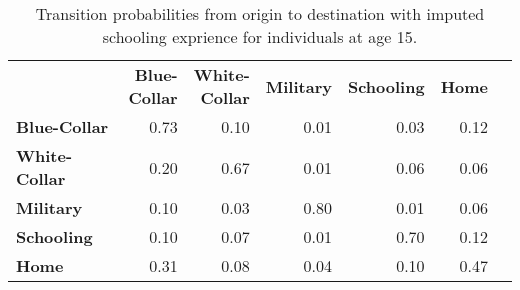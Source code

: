 \begin{ThreePartTable}

	\begin{longtable}[c]{@{}lrrrrrr@{}}
		\caption{Transition probabilities from origin to destination with imputed schooling exprience for individuals at age 15.}
		\label{tab:TransitionProbabilitiesImputing}

		\setlength\extrarowheight{2.5pt}
		
		\\
		\toprule
   & \thead{\textbf{Blue-} \\ \textbf{Collar}}    & \thead{\textbf{White-} \\ \textbf{Collar}}  & \textbf{Military} & \textbf{Schooling} & \textbf{Home}   \\ \midrule
		\endfirsthead
		
\textbf{Blue-Collar}	&	0.73	&	0.10	&	0.01	&	0.03	&	0.12	\\
\textbf{White-Collar	} &	0.20	&	0.67	&	0.01	&	0.06	&	0.06	\\
\textbf{Military	} &	0.10	&	0.03	&	0.80	&	0.01	&	0.06	\\
\textbf{Schooling}	&	0.10&	0.07	&	0.01	&	0.70	&	0.12	\\
\textbf{Home	} &	0.31	&	0.08	&	0.04	&	0.10	&	0.47	\\
  \bottomrule
	\end{longtable}
\end{ThreePartTable}
